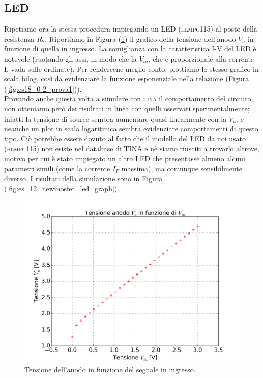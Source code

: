 \documentclass[journal, a4paper]{IEEEtran}
\begin{document}
\subsection{LED}
Ripetiamo ora la stessa procedura impiegando un LED (\textsc{hlmpc115}) al posto della resistenza $R_2$. Riportiamo in Figura (\ref{fig:es18_prova1}) il grafico della tensione dell'anodo $V_a$ in funzione di quella in ingresso. La somiglianza con la caratteristica I-V del LED è notevole (ruotando gli assi, in modo che la $V_{in}$, che è proporzionale alla corrente I, vada sulle ordinate). Per rendercene meglio conto, plottiamo lo stesso grafico in scala bilog, così da evidenziare la funzione esponenziale nella relazione (Figura (\ref{fig:es18_0-2_prova1})).\\
Provando anche questa volta a simulare con \textsc{tina} il comportamento del circuito, non otteniamo però dei risultati in linea con quelli osservati sperimentalmente; infatti la tensione di source sembra aumentare quasi linearmente con la $V_{in}$ e neanche un plot in scala logaritmica sembra evidenziare comportamenti di questo tipo. Ciò potrebbe essere dovuto al fatto che il modello del LED da noi usato (\textsc{hlmpc115}) non esiste nel database di TINA e nè siamo riusciti a trovarlo altrove, motivo per cui è stato impiegato un altro LED che presentasse almeno alcuni parametri simili (come la corrente $I_F$ massima), ma comunque sensibilmente diverso. I risultati della simulazione sono in Figura (\ref{fig:es_12_newmosfet_led_graph}).

\begin{figure}
\centering
\includegraphics[width=0.9\linewidth]{./es18_prova1}
\caption{Tensione dell'anodo in funzione del segnale in ingresso.}
\label{fig:es18_prova1}
\end{figure}
\end{document}
